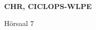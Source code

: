 \documentclass[a4paper]{article}
\begin{document}
\printGenericVSLHeader
\begin{center}
\begin{vsltext}{3cm}{4cm}

   \vspace{0.5cm} 

    \textbf{CHR, CICLOPS-WLPE} 

    \vspace{1.5cm}

    Hörsaal 7

\end{vsltext}

\end{center}
\end{document}
